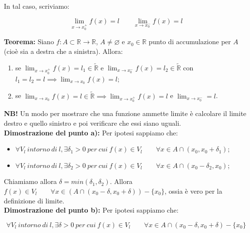 \documentclass{article}
\begin{document}
\noindent In tal caso, scriviamo:

\begin{equation*}
    \lim_{x \to x_0^+} f(x) = l \qquad \lim_{x \to x_0^-} f(x) = l
\end{equation*}

\noindent\textbf{Teorema:} Siano $f: A \subset \mathbb{R} \xrightarrow{} \mathbb{R}$, $A \neq \varnothing$ e $x_0 \in \mathbb{R}$ punto di accumulazione per $A$ (cioè sia a destra che a sinistra). Allora:

\begin{enumerate}[label=\alph{enumi})]
    \item se $\lim_{x \to x^+_0} f(x) = l_1 \in \widetilde{\mathbb{R}}$ e $\lim_{x \to x^-_0} f(x) = l_2 \in \widetilde{\mathbb{R}}$ con $l_1 = l_2 = l \implies \lim_{x \to x_0} f(x) = l$;
    \item se $\lim_{x \to x_0} f(x) = l \in \widetilde{\mathbb{R}} \implies \lim_{x \to x^+_0} f(x) = l$ e $\lim_{x \to x^-_0} = l$.
\end{enumerate}

\noindent\textbf{NB!} Un modo per mostrare che una funzione ammette limite è calcolare il limite destro e quello sinistro e poi verificare che essi siano uguali.\\

\noindent\textbf{Dimostrazione del punto a):} Per ipotesi sappiamo che:

\begin{itemize}
    \item $\forall V_l \ intorno \ di \ l, \exists \delta_1 > 0 \ per \ cui \ f(x) \in V_l \qquad \forall x \in A \cap (x_0, x_0 + \delta_1)$;
    \item $\forall V_l \ intorno \ di \ l, \exists \delta_2 > 0 \ per \ cui \ f(x) \in V_l \qquad \forall x \in A \cap (x_0 - \delta_2, x_0)$;
\end{itemize}

\noindent Chiamiamo allora $\delta = min(\delta_1, \delta_2)$. Allora $f(x) \in V_l \qquad \forall x \in (A \cap (x_0 - \delta, x_0 + \delta)) - \{x_0\}$, ossia è vero per la definizione di limite.\\

\noindent\textbf{Dimostrazione del punto b):} Per ipotesi sappiamo che:

\begin{equation*}
    \forall V_l \ intorno \ di \ l, \exists \delta > 0 \ per \ cui \ f(x) \in V_l \qquad \forall x \in A \cap (x_0 - \delta, x_0 + \delta) - \{x_0\}
\end{equation*}
\end{document}

